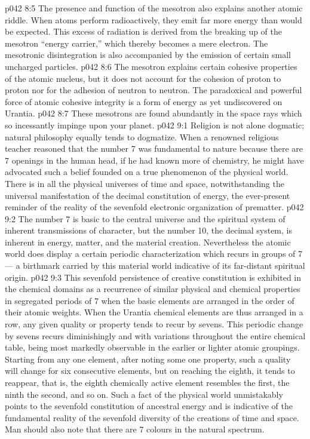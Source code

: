 \vs p042 8:5 The presence and function of the mesotron also explains another atomic riddle. When atoms perform radioactively, they emit far more energy than would be expected. This excess of radiation is derived from the breaking up of the mesotron “energy carrier,” which thereby becomes a mere electron. The mesotronic disintegration is also accompanied by the emission of certain small uncharged particles.
\vs p042 8:6 The mesotron explains certain cohesive properties of the atomic nucleus, but it does not account for the cohesion of proton to proton nor for the adhesion of neutron to neutron. The paradoxical and powerful force of atomic cohesive integrity is a form of energy as yet undiscovered on Urantia.
\vs p042 8:7 These mesotrons are found abundantly in the space rays which so incessantly impinge upon your planet.
\vs p042 9:1 Religion is not alone dogmatic; natural philosophy equally tends to dogmatize. When a renowned religious teacher reasoned that the number 7 was fundamental to nature because there are 7 openings in the human head, if he had known more of chemistry, he might have advocated such a belief founded on a true phenomenon of the physical world. There is in all the physical universes of time and space, notwithstanding the universal manifestation of the decimal constitution of energy, the ever\hyp{}present reminder of the reality of the sevenfold electronic organization of prematter.
\vs p042 9:2 The number 7 is basic to the central universe and the spiritual system of inherent transmissions of character, but the number 10, the decimal system, is inherent in energy, matter, and the material creation. Nevertheless the atomic world does display a certain periodic characterization which recurs in groups of 7 --- a birthmark carried by this material world indicative of its far\hyp{}distant spiritual origin.
\vs p042 9:3 This sevenfold persistence of creative constitution is exhibited in the chemical domains as a recurrence of similar physical and chemical properties in segregated periods of 7 when the basic elements are arranged in the order of their atomic weights. When the Urantia chemical elements are thus arranged in a row, any given quality or property tends to recur by sevens. This periodic change by sevens recurs diminishingly and with variations throughout the entire chemical table, being most markedly observable in the earlier or lighter atomic groupings. Starting from any one element, after noting some one property, such a quality will change for six consecutive elements, but on reaching the eighth, it tends to reappear, that is, the eighth chemically active element resembles the first, the ninth the second, and so on. Such a fact of the physical world unmistakably points to the sevenfold constitution of ancestral energy and is indicative of the fundamental reality of the sevenfold diversity of the creations of time and space. Man should also note that there are 7 colours in the natural spectrum.
